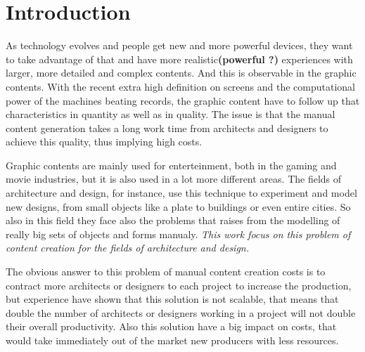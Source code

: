 
% 
% 

\section{Introduction}



As technology evolves and people get new and more powerful devices, they want to take advantage of that and have more realistic\textbf{(powerful ?)} experiences with larger, more detailed and complex contents.
And this is observable in the graphic contents. With the recent extra high definition on screens and the computational power of the machines beating records, the graphic content have to follow up that characteristics in quantity as well as in quality. The issue is that the manual content generation takes a long work time from architects and designers to achieve this quality, thus implying high costs.

Graphic contents are mainly used for enterteinment, both in the gaming and movie industries, but it is also used in a lot more different areas. The fields of architecture and design, for instance, use this technique to experiment and model new designs, from small objects like a plate to buildings or even entire cities. So also in this field they face also the problems that raises from the modelling of really big sets of objects and forms manualy. \emph{This work focus on this problem of content creation for the fields of architecture and design.}

The obvious answer to this problem of manual content creation costs is to contract more architects or designers to each project to increase the production, but experience have shown that this solution is not scalable, that means that double the number of architects or designers working in a project will not double their overall productivity. Also this solution have a big impact on costs, that would take immediately out of the market new producers with less resources.


